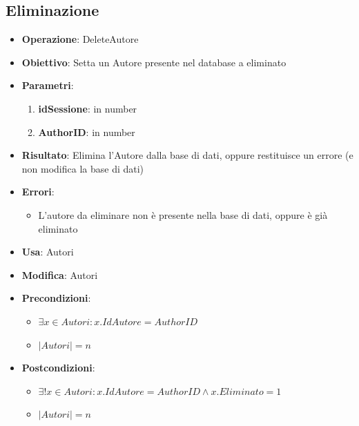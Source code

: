 \documentclass[a4paper,11pt]{article}
\begin{document}
\subsection{Eliminazione}
\begin{itemize}
	\item \textbf{Operazione}: DeleteAutore
	\item \textbf{Obiettivo}: Setta un Autore presente nel database a eliminato
	\item \textbf{Parametri}:
	\begin{enumerate}
		\item \textbf{idSessione}: in number
		\item \textbf{AuthorID}: in number
	\end{enumerate}
	\item \textbf{Risultato}: Elimina l'Autore dalla base di dati, oppure restituisce un errore (e non modifica la base di dati)
	\item \textbf{Errori}: 
	\begin{itemize}
		\item L'autore da eliminare non è presente nella base di dati, oppure è già eliminato
	\end{itemize}
	\item \textbf{Usa}: Autori
	\item \textbf{Modifica}: Autori
	\item \textbf{Precondizioni}:
	\begin{itemize}
		\item $\exists x \in Autori : x.IdAutore = AuthorID$
		\item $|Autori| = n$
	\end{itemize}
	\item \textbf{Postcondizioni}:
	\begin{itemize}
		\item $\exists! x \in Autori : x.IdAutore = AuthorID \land x.Eliminato = 1$
		\item $|Autori| = n$
	\end{itemize}
\end{itemize}


\end{document}
